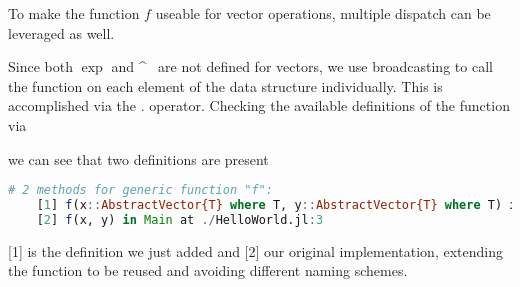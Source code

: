 

To make the function $f$ useable for vector operations, multiple dispatch can be leveraged as well. 



Since both $\exp$ and \^~ are not defined for vectors, we use broadcasting to call the function on each element of the data structure individually. This is accomplished via the 
. operator. Checking the available definitions of the function via 



we can see that two definitions are present

\begin{lstlisting}[language=Julia]
    # 2 methods for generic function "f":
    [1] f(x::AbstractVector{T} where T, y::AbstractVector{T} where T) in Main at ./HelloWorld.jl:32
    [2] f(x, y) in Main at ./HelloWorld.jl:3
\end{lstlisting}

[1] is the definition we just added and [2] our original implementation, extending the function to be reused and avoiding different naming schemes.

\newpage




